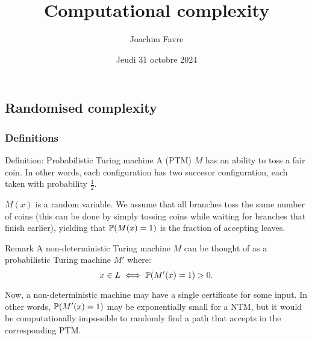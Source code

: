 \documentclass[a4paper]{article}
\title{Computational complexity}
\author{Joachim Favre}
\date{Jeudi 31 octobre 2024}
\begin{document}
\maketitle


\subsection{Randomised complexity}

\subsubsection{Definitions}


\begin{parag}{Definition: Probabilistic Turing machine}
    A  (PTM) $M$ has an ability to toss a fair coin. In other words, each configuration has two succesor configuration, each taken with probability $\frac{1}{2}$.

    $M\left(x\right)$ is a random variable. We assume that all branches toss the same number of coins (this can be done by simply tossing coins while waiting for branches that finish earlier), yielding that $\prob\left(M\left(x\right) = 1\right)$ is the fraction of accepting leaves.

    \begin{subparag}{Remark}
        A non-deterministic Turing machine $M$ can be thought of as a probabilistic Turing machine $M'$ where: 
        \[x \in L \iff \prob\left(M'\left(x\right) = 1\right) > 0.\]

        Now, a non-deterministic machine may have a single certificate for some input. In other words, $\prob\left(M'\left(x\right) = 1\right)$ may be exponentially small for a NTM, but it would be computationally impossible to randomly find a path that accepts in the corresponding PTM.
    \end{subparag}
\end{parag}
\end{document}
